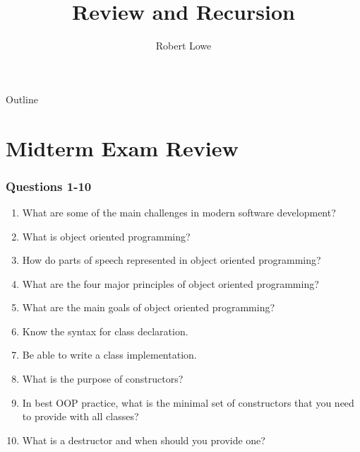 \documentclass{beamer}
\title{Review and Recursion}
\author{Robert Lowe\\}
\institute[Maryville College] %
{
  Division of Mathematics and Computer Science\\
  Maryville College
}
\date[]{}
\newcounter{question}
\begin{document}
\begin{frame}
  \titlepage
\end{frame}

\begin{frame}{Outline}
  \tableofcontents
\end{frame}





\section{Midterm Exam Review}
\begin{frame}
    \frametitle{Questions 1-10}
    \begin{enumerate}[<+->]
        \item What are some of the main challenges in modern software development?
        \item What is object oriented programming?
        \item How do parts of speech represented in object oriented programming?
        \item What are the four major principles of object oriented programming?
        \item What are the main goals of object oriented programming?
        \item Know the syntax for class declaration.
        \item Be able to write a class implementation.
        \item What is the purpose of constructors?
        \item In best OOP practice, what is the minimal set of constructors that you need to provide with all classes?
        \item What is a destructor and when should you provide one?
        \setcounter{question}{\value{enumi}}
    \end{enumerate}
\end{frame}
\end{document}
